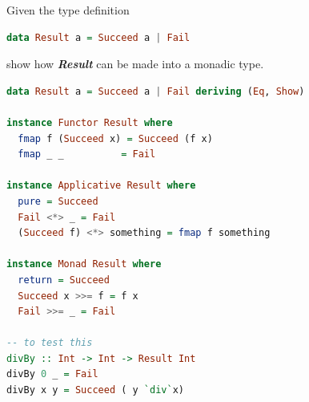 \documentclass{article}
\begin{document}
                       
           
                    
                    




\begin{exercise}
Given the type definition
\begin{lstlisting}[language=Haskell]
  	data Result a = Succeed a | Fail	
\end{lstlisting}

show how \textit{\textbf{Result}}  can be made into a monadic type.
\end{exercise}

\begin{solution}
\begin{lstlisting}[language=Haskell]
  data Result a = Succeed a | Fail deriving (Eq, Show)

instance Functor Result where
  fmap f (Succeed x) = Succeed (f x)
  fmap _ _          = Fail

instance Applicative Result where 
  pure = Succeed
  Fail <*> _ = Fail
  (Succeed f) <*> something = fmap f something

instance Monad Result where
  return = Succeed
  Succeed x >>= f = f x
  Fail >>= _ = Fail
  
-- to test this 
divBy :: Int -> Int -> Result Int
divBy 0 _ = Fail
divBy x y = Succeed ( y `div`x)
\end{lstlisting}
\end{solution}
\end{document}
